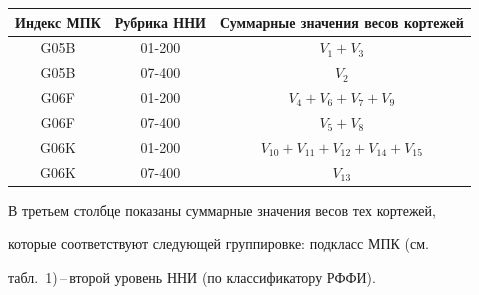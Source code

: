      \begin{table}\small %


     \begin{center}


     \parbox{318pt}{


}





      \vspace*{2ex}


      


      \begin{tabular}{|c|c|c|}


      \hline


Индекс МПК&Рубрика ННИ&Суммарные значения весов кортежей\\


\hline


G05B&01-200&$V_1+V_3$\\


G05B&07-400&$V_2$\\


G06F&01-200&$V_4+V_6+V_7+V_9$\\


G06F&07-400&$V_5+V_8$\\


G06K&01-200&$V_{10}+V_{11}+V_{12}+V_{14}+V_{15}$\\


G06K&07-400&$V_{13}$\\


\hline


\end{tabular}


\end{center}


\vspace*{-12pt}


\end{table}


     


     В третьем столбце показаны суммарные значения весов тех кортежей, 


которые соответствуют следующей группировке: подкласс МПК (см.\ 


табл.~1)\,--\,вто\-рой уровень ННИ (по классификатору РФФИ).


